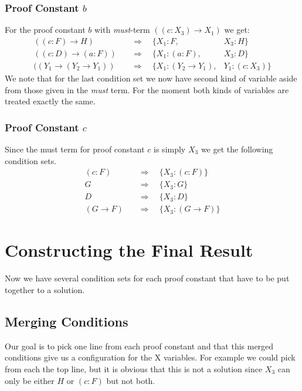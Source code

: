 \subsubsection[look up proof constant b]{Proof Constant $b$}
For the proof constant $b$ with \emph{must}-term $((c:X_3) \rightarrow X_1)$ we get:
\begin{align}
	((c:F) \rightarrow H) & \quad \Rightarrow \quad \{X_1: F, & X_3: H\}\\ 
	((c:D) \rightarrow (a:F)) & \quad \Rightarrow \quad \{X_1: (a:F), & X_3: D\}\\ 
	((Y_1 \rightarrow (Y_2 \rightarrow Y_1)) & \quad \Rightarrow \quad \{X_1: (Y_2 \rightarrow Y_1), & Y_1: (c:X_3)\} \label{condition:b}
\end{align}
We note that for the last condition set we now have second kind of variable aside from those given in the \emph{must} term. For the moment both kinds of variables are treated exactly the same.

\subsubsection[look up proof constant c]{Proof Constant $c$}
Since the must term for proof constant $c$ is simply $X_3$ we get the following condition sets.
\begin{align}
	(c:F) & \quad \Rightarrow \quad \{X_3: (c:F)\} \\ 
	G & \quad \Rightarrow \quad \{X_3: G\} \\ 
	D & \quad \Rightarrow \quad \{X_3: D\}\label{condition:c} \\ 
	(G \rightarrow F) & \quad \Rightarrow \quad \{X_3: (G \rightarrow F)\} 
\end{align}

\section{Constructing the Final Result}
Now we have several condition sets for each proof constant that have to be put together to a solution.
\subsection{Merging Conditions}
Our goal is to pick one line from each proof constant and that this merged conditions give us a configuration for the X variables. For example we could pick from each the top line, but it is obvious that this is not a solution since $X_3$ can only be either $H$ or $(c:F)$ but not both.

